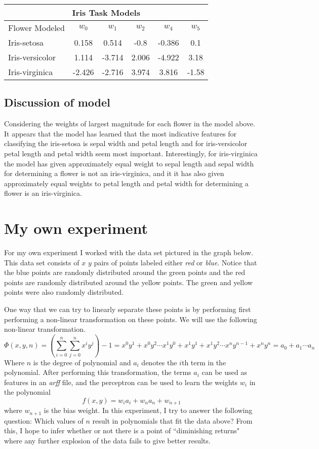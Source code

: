 \documentclass[12pt,letterpaper]{article}
\begin{document}
\begin{center}
\begin{tabular}{lccccc}
\toprule
\multicolumn{6}{c}{Iris Task Models} \\
\hline
Flower Modeled	&	$w_0$	&	$w_1$	&	$w_2$	&	$w_4$	&	$w_5$\\
\hline
Iris-setosa	&	0.158	&	0.514	&	-0.8	&	-0.386	&	0.1\\
Iris-versicolor	&	1.114	&	-3.714	&	2.006	&	-4.922	&	3.18\\
Iris-virginica	&	-2.426	&	-2.716	&	3.974	&	3.816	&	-1.58\\
\bottomrule
\end{tabular}
\end{center}

\subsection*{Discussion of model}

Considering the weights of largest magnitude for each flower in the model above. It appears that the model has learned that the most indicative features for classifying the iris-setosa is sepal width and petal length and for iris-versicolor petal length and petal width seem most important. Interestingly, for iris-virginica the model has given approximately equal weight to sepal length and sepal width for determining a flower is not an iris-virginica, and it it has also given approximately equal weights to petal length and petal width for determining a flower is an iris-virginica.

\section*{My own experiment}

For my own experiment I worked with the data set pictured in the graph below. This data set consists of $x$ $y$ pairs of points labeled either \emph{red} or \emph{blue}. Notice that the blue points are randomly distributed around the green points and the red points are randomly distributed around the yellow points. The green and yellow points were also randomly distributed.

One way that we can try to linearly separate these points is by performing first performing a non-linear transformation on these points. We will use the following non-linear transformation.
$$\Phi(x,y,n) = (\sum\limits_{i=0}^n \sum\limits_{j=0}^nx^iy^j) - 1 = x^0y^1 + x^0y^2 \cdots x^1y^0 + x^1y^1 + x^1y^2 \cdots x^ny^{n-1} + x^ny^n = a_0 + a_1 \cdots a_n$$
Where $n$ is the degree of polynomial and $a_i$ denotes the $i$th term in the polynomial. After performing this transformation, the terms $a_i$ can be used as features in an \emph{arff} file, and the perceptron can be used to learn the weights $w_i$ in the polynomial
$$f(x,y) = w_ia_i + w_na_n + w_{n+1}$$
where $w_{n+1}$ is the bias weight. In this experiment, I try to answer the following question: Which values of $n$ result in polynomials that fit the data above? From this, I hope to infer whether or not there is a point of ``diminishing returns" where any further explosion of the data fails to give better results. 
\end{document}
